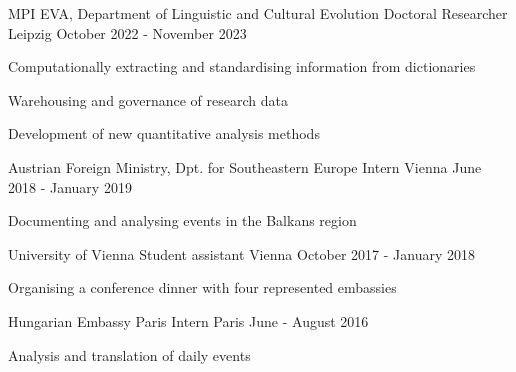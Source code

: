 \begin{cventries}

  \cventry
    {MPI EVA, Department of Linguistic and Cultural Evolution} %
    {Doctoral Researcher} %
    {Leipzig} %
    {October 2022 - November 2023} %
    {
      \begin{cvitems} %
      \item{Computationally extracting and standardising information from dictionaries}
      \item{Warehousing and governance of research data}
      \item{Development of new quantitative analysis methods}
      \end{cvitems}
    }
    
  \cventry
    {Austrian Foreign Ministry, Dpt. for Southeastern Europe} %
    {Intern} %
    {Vienna} %
    {June 2018 - January 2019} %
    {
      \begin{cvitems} %
        \item{Documenting and analysing events in the Balkans region}
      \end{cvitems}
    }

  \cventry
    {University of Vienna} %
    {Student assistant} %
    {Vienna} %
    {October 2017 - January 2018} %
    {
    \begin{cvitems}
    {Organising a conference dinner with four represented embassies}
    \end{cvitems}
    }
    
  \cventry
    {Hungarian Embassy Paris} %
    {Intern} %
    {Paris} %
    {June - August 2016} %
    {
    \begin{cvitems}
    {Analysis and translation of daily events}
    \end{cvitems}
    }
    
\end{cventries}


